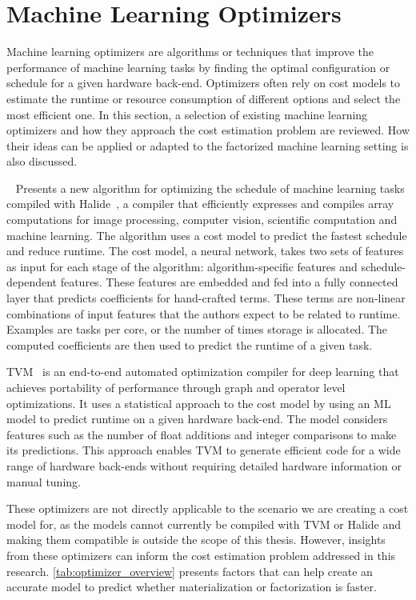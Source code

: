 \section{Machine Learning Optimizers}
\label{sec:3-ml-optimizers}
Machine learning optimizers are algorithms or techniques that improve the performance of machine learning tasks by finding the optimal configuration or schedule for a given hardware back-end. Optimizers often rely on cost models to estimate the runtime or resource consumption of different options and select the most efficient one. In this section, a selection of existing machine learning optimizers and how they approach the cost estimation problem are reviewed. How their ideas can be applied or adapted to the factorized machine learning setting is also discussed.

~\cite{halide_cost_model} Presents a new algorithm for optimizing the schedule of machine learning tasks compiled with Halide~\cite{halide_examples}, a compiler that efficiently expresses and compiles array computations for image processing, computer vision, scientific computation and machine learning. The algorithm uses a cost model to predict the fastest schedule and reduce runtime. The cost model, a neural network, takes two sets of features as input for each stage of the algorithm: algorithm-specific features and schedule-dependent features. These features are embedded and fed into a fully connected layer that predicts coefficients for hand-crafted terms. These terms are non-linear combinations of input features that the authors expect to be related to runtime. Examples are tasks per core, or the number of times storage is allocated. The computed coefficients are then used to predict the runtime of a given task.

TVM~\cite{tvm} is an end-to-end automated optimization compiler for deep learning that achieves portability of performance through graph and operator level optimizations. It uses a statistical approach to the cost model by using an ML model to predict runtime on a given hardware back-end. The model considers features such as the number of float additions and integer comparisons to make its predictions. This approach enables TVM to generate efficient code for a wide range of hardware back-ends without requiring detailed hardware information or manual tuning.

These optimizers are not directly applicable to the scenario we are creating a cost model for, as the models cannot currently be compiled with TVM or Halide and making them compatible is outside the scope of this thesis. However, insights from these optimizers can inform the cost estimation problem addressed in this research. \autoref{tab:optimizer_overview} presents factors that can help create an accurate model to predict whether materialization or factorization is faster.

